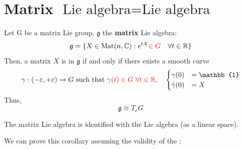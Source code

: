 \documentclass[../main.tex]{subfiles}
\begin{document}
\section{Matrix $\textrm{Lie algebra}=\textrm{Lie algebra}$}
\begin{corollary}
Let G be a matrix Lie group, $\mathfrak{g}$ the \textbf{matrix} Lie algebra: 
\[
\mathfrak{g}=\{X\in\text{Mat}(n,\mathbb{C}):e^{tX}{\color{red}\in G}\quad \forall t\in\mathbb{R}\}
\]
Then, a matrix $X$ is in $\mathfrak{g}$ if and only if there exists a smooth curve 
\[
\gamma:(-\varepsilon,+\varepsilon)\xrightarrow[]{}G \ \textrm{such that}\ {\color{red}\gamma(t)\in G \ \forall t\in\mathbb{R}}, \quad\begin{cases}
\gamma(0)&=\mathbb{1}\\
\Dot{\gamma}(0)&=X
\end{cases}
\]
Thus, \[
\mathfrak{g}\cong T_eG
\]

The matrix Lie algebra is identified with the Lie algebra (as a linear space).
\end{corollary}
We can prove this corollary assuming the validity of the :
\end{document}
